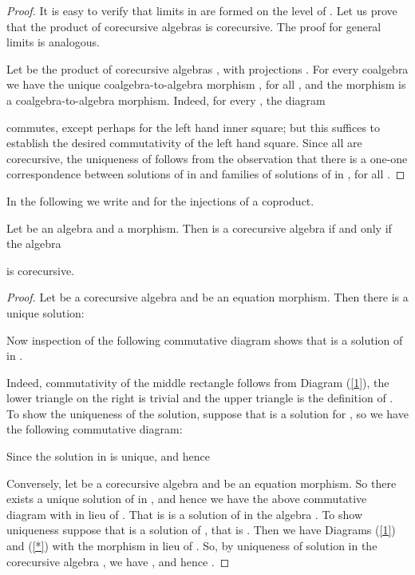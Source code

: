 \documentclass{LMCS}
\theoremstyle{plain}
\theoremstyle{definition}
\numberwithin{equation}{section}
\begin{document}
\begin{proof}
It is easy to verify that limits in  are formed on the level of . Let us prove that the product of corecursive algebras is  corecursive. The proof for general limits is analogous.

Let  be  the product of corecursive algebras , with projections . For every coalgebra  we have the unique coalgebra-to-algebra morphism , for all , and the morphism  is a coalgebra-to-algebra morphism. Indeed, for every , the diagram

commutes, except perhaps for the left hand inner square; but this
suffices to establish the desired commutativity of the left hand
square.  Since all  are corecursive, the uniqueness of
 follows from the observation that there is a one-one
correspondence between solutions  of  in  and
families of solutions  of  in , for all
.
\end{proof}

In the following we write  and  for the injections of a coproduct.

\begin{lem}\label{generalized}
Let  be an algebra and   a morphism. Then  is a corecursive algebra if and only if the algebra

is corecursive.
\end{lem}

\begin{proof}
Let  be a corecursive algebra and  be an equation morphism. Then there is a unique solution:

Now inspection of the following commutative diagram shows that  is a solution of  in .

Indeed, commutativity of the middle rectangle follows from Diagram (\ref{1}), the lower triangle on the right is trivial and the upper triangle is the definition of .
To show the uniqueness of the solution, suppose that  is a solution for , so we have the following commutative diagram:

Since the solution  in  is unique,  and hence


Conversely, let  be a corecursive algebra and  be an equation morphism. So there exists a unique solution  of  in , and hence we have the above commutative diagram with  in lieu  of . That is  is a solution of  in the algebra  . To show uniqueness suppose that  is a solution of , that is . Then we have Diagrams (\ref{1}) and (\ref{*}) with the morphism  in lieu of . So, by uniqueness of solution in the corecursive algebra , we have   , and hence .
\end{proof}
\end{document}
